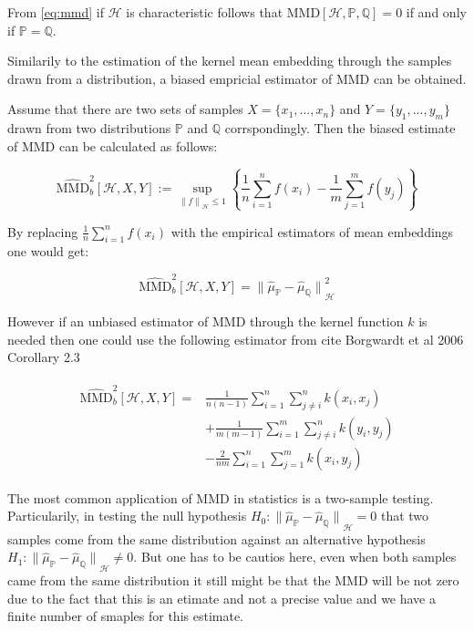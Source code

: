 From \ref{eq:mmd} if $\mathscr{H}$ is characteristic follows that $\textrm{MMD}[\mathscr{H}, \mathds{P}, \mathds{Q}] = 0$ if and only if $\mathds{P} = \mathds{Q}$.

Similarily to the estimation of the kernel mean embedding through the samples drawn from a distribution, a biased empricial estimator of MMD can be obtained. 

Assume that there are two sets of samples $X=\{x_1, ..., x_n\}$ and $Y=\{y_1, ..., y_m\}$ drawn from two distributions $\mathds{P}$ and $\mathds{Q}$ corrspondingly. Then the biased estimate of MMD can be calculated as follows:

\begin{equation}
    \widehat{\textrm{MMD}}_b^2 [\mathscr{H}, X, Y] := \sup_{ {\lVert f \rVert}_{\mathscr{H}} \leq 1} \left\{ \frac{1}{n} \sum^n_{i=1}{f(x_i)} - \frac{1}{m} \sum^m_{j=1}{f(y_j)} \right\} 
\end{equation}

By replacing $\frac{1}{n}\sum^n_{i=1}{f(x_i)}$ with the empirical estimators of mean embeddings one would get:

\begin{equation}
    \widehat{\textrm{MMD}}_b^2 [\mathscr{H}, X, Y] = {\lVert \widehat{\mu}_{\mathds{P}} - \widehat{\mu}_{\mathds{Q}} \rVert }_{\mathscr{H}}^2
\end{equation}

However if an unbiased estimator of MMD through the kernel function $k$ is needed then one could use the following estimator from cite Borgwardt et al 2006 Corollary 2.3

\begin{align}
    \begin{split}
        \widehat{\textrm{MMD}}_b^2 [\mathscr{H}, X, Y] = & \frac{1}{n(n-1)} \sum^n_{i=1}\sum^n_{j \neq i}k(x_i, x_j)\\
        & + \frac{1}{m(m-1)} \sum^m_{i=1}\sum^n_{j \neq i}k(y_i, y_j) \\
        & -\frac{2}{nm} \sum^n_{i=1}\sum^m_{j=1}k(x_i, y_j)
    \end{split}
\end{align}

The most common application of MMD in statistics is a two-sample testing. Particularily, in testing the null hypothesis $H_0:{\lVert \widehat{\mu}_{\mathds{P}} - \widehat{\mu}_{\mathds{Q}} \rVert }_{\mathscr{H}}=0$ that two samples come from the same distribution against an alternative hypothesis $H_1:{\lVert \widehat{\mu}_{\mathds{P}} - \widehat{\mu}_{\mathds{Q}} \rVert }_{\mathscr{H}}\neq0$. But one has to be cautios here, even when both samples came from the same distribution it still might be that the MMD will be not zero due to the fact that this is an etimate and not a precise value and we have a finite number of smaples for this estimate.


